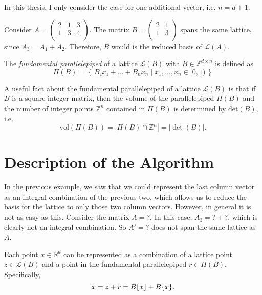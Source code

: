 In this thesis, I only consider the case for one additional vector, i.e. $n = d + 1$.

\begin{example}
  Consider $A = \begin{pmatrix}
    2 & 1 & 3 \\
    1 & 3 & 4 \\
  \end{pmatrix}$.
  The matrix $B = \begin{pmatrix}
    2 & 1 \\
    1 & 3 \\
  \end{pmatrix}$
  spans the same lattice,
  since $A_3 = A_1 + A_2$.
  Therefore, $B$ would is the reduced basis of $\mathcal L(A)$.
\end{example}


\begin{definition}
  The \emph{fundamental parallelepiped} of a lattice $\mathcal{L}(B)$ with $B ∈ ℤ^{d × n}$ is defined as
  \[
    Π(B) = \left\{\, B₁ x₁ + \dots + B_n x_n \mid x_1, \dots, x_n ∈ [0, 1) \,\right\}
  \]
\end{definition}

A useful fact about the fundamental parallelepiped of a lattice $\mathcal L(B)$ is that
if $B$ is a square integer matrix,
then the volume of the parallelepiped $Π(B)$ and
the number of integer points $ℤ^n$ contained in $Π(B)$ is determined by $\mathrm{det}(B)$,
i.e.
\[
  \mathrm{vol}(Π(B)) = |Π(B) ∩ ℤ^n| = |\det(B)|.
\]

\section{Description of the Algorithm}

In the previous example,
we saw that we could represent the last column vector as an integral
combination of the previous two,
which allows us to reduce the basis for the lattice to only those two column vectors.
However, in general it is not as easy as this.
Consider the matrix $A = ?$.
In this case, $A_3 = ? + ?$, which is clearly not an integral combination.
So $A' = ?$ does not span the same lattice as $A$.

Each point $x ∈ ℝ^d$ can be represented as a combination of a lattice point $z
∈ \mathcal{L}(B)$ and a point in the fundamental parallelepiped $r ∈ Π(B)$.
Specifically,
\[
  x = z + r = B\lfloor x\rfloor + B\{x\}.
\]

